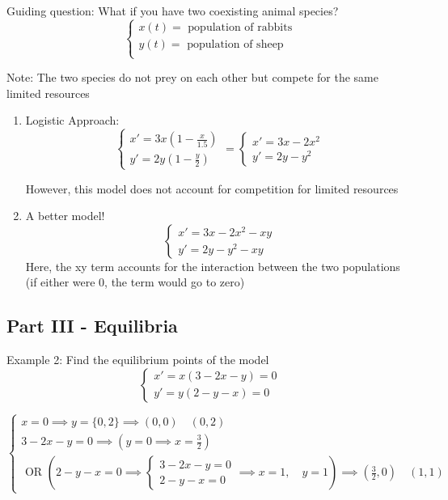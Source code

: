 \documentclass[12pt]{article}
\begin{document}
Guiding question: What if you have two coexisting animal species?
\[\begin{cases}
    x(t) = \text{ population of rabbits}\\
    y(t) = \text{ population of sheep}\\
\end{cases}\]

Note: The two species do not prey on each other but compete for the same limited resources 

\begin{enumerate}
    \item Logistic Approach:
    \[\begin{cases}
        x' = 3x(1 - \frac{x}{1.5})\\
        y' = 2y(1 - \frac{y}{2})
    \end{cases} = \begin{cases}
        x' = 3x - 2x^2\\
        y' = 2y - y^2
    \end{cases}\]
    
    However, this model does not account for competition for limited resources
    
    \item A better model!
    \[\begin{cases}
        x' = 3x - 2x^2 - xy\\
        y' = 2y - y^2 - xy
    \end{cases}\]
    Here, the xy term accounts for the interaction between the two populations 
    (if either were 0, the term would go to zero)
\end{enumerate}

\subsection*{Part III - Equilibria}
Example 2: Find the equilibrium points of the model 
\[\begin{cases}
    x' = x(3 - 2x - y) = 0\\
    y' = y(2 - y - x) = 0
\end{cases}\]

\[\begin{cases}
    x = 0 \implies y = \{0, 2\} \implies \boxed{(0, 0) \quad (0, 2)}\\
    3 - 2x - y = 0 \implies (y = 0 \implies x = \frac{3}{2}) \\
    \text{ OR } \left(2-y-x = 0 \implies \begin{cases}
        3 - 2x - y = 0\\
        2 - y - x = 0
    \end{cases} \implies x = 1, \quad y = 1\right) \implies \boxed{(\frac{3}{2}, 0) \quad (1, 1)}
\end{cases}\]
\end{document}
